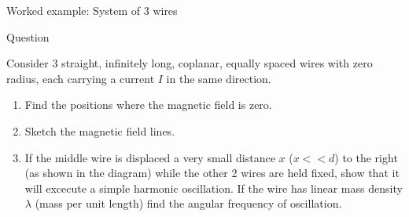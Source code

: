 {
\problemslide

%
%
%

\begin{frame}{Worked example: System of 3 wires}

  \begin{blockexmplque}{Question}
    \begin{minipage}[r]{0.75\textwidth}
      Consider 3 straight, infinitely long, coplanar,
      equally spaced wires with zero radius,
      each carrying a current $I$ in the same direction.
      \begin{enumerate}
        \item Find the positions where the magnetic field is zero.
        \item Sketch the magnetic field lines.
        \item If the middle wire is displaced a very small distance $x$
         ($x << d$) to the right (as shown in the diagram)
         while the other 2 wires are held fixed,
         show that it will excecute a simple harmonic oscillation.
         If the wire has linear mass density $\lambda$ (mass per unit length)
         find the angular frequency of oscillation.
      \end{enumerate}
    \end{minipage}
    \begin{minipage}[l]{0.20\textwidth}
     \begin{center}

\end{center}
\end{minipage}
\end{blockexmplque}
\end{frame}}
